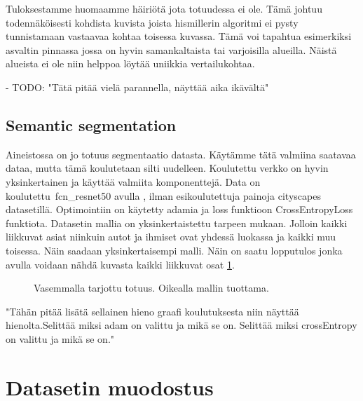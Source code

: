 Tuloksestamme huomaamme häiriötä jota totuudessa ei ole. Tämä johtuu todennäköisesti kohdista kuvista joista hismillerin algoritmi ei pysty tunnistamaan vastaavaa kohtaa toisessa kuvassa. Tämä voi tapahtua esimerkiksi asvaltin pinnassa jossa on hyvin samankaltaista tai varjoisilla alueilla. Näistä alueista ei ole niin helppoa löytää uniikkia vertailukohtaa. 

- TODO: "Tätä pitää vielä parannella, näyttää aika ikävältä"

\subsection{Semantic segmentation}

Aineistossa on jo totuus segmentaatio datasta. Käytämme tätä valmiina saatavaa dataa, mutta tämä koulutetaan silti uudelleen. Koulutettu verkko on hyvin yksinkertainen ja käyttää valmiita komponenttejä. Data on koulutettu\ fcn\_resnet50 avulla \cite{pytorchfcnresnet50}, ilman esikoulutettuja painoja cityscapes datasetillä. Optimointiin on käytetty adamia ja loss funktioon CrossEntropyLoss funktiota. Datasetin mallia on yksinkertaistettu tarpeen mukaan. Jolloin kaikki liikkuvat asiat niinkuin autot ja ihmiset ovat yhdessä luokassa ja kaikki muu toisessa. Näin saadaan yksinkertaisempi malli. Näin on saatu lopputulos jonka avulla voidaan nähdä kuvasta kaikki liikkuvat osat \ref{fig:segmentation1}.

\begin{figure}
\centering
{}
\caption[Tämä on lyhyt kuvateksti.]{Vasemmalla tarjottu totuus. Oikealla mallin tuottama.}
\label{fig:segmentation1}
\end{figure}
    

"Tähän pitää lisätä sellainen hieno graafi koulutuksesta niin näyttää hienolta.Selittää miksi adam on valittu ja mikä se on. Selittää miksi crossEntropy on valittu ja mikä se on."

\section{Datasetin muodostus}

